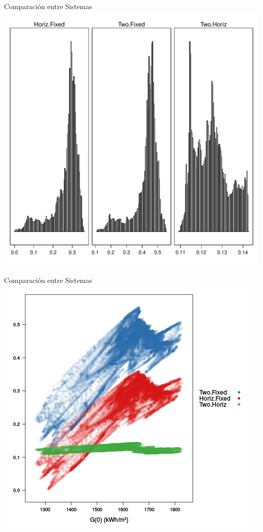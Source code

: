 \documentclass[xcolor={usenames,svgnames,dvipsnames}]{beamer}
\begin{document}
\begin{frame}[label=sec-4-1-4]{Comparación entre Sistemas}
\includegraphics[width=.9\linewidth]{../figs/compSystems.pdf}
\end{frame}

\begin{frame}[label=sec-4-1-5]{Comparación entre Sistemas}
\includegraphics[width=.9\linewidth]{../figs/compSystemsG0.png}
\end{frame}
\end{document}
